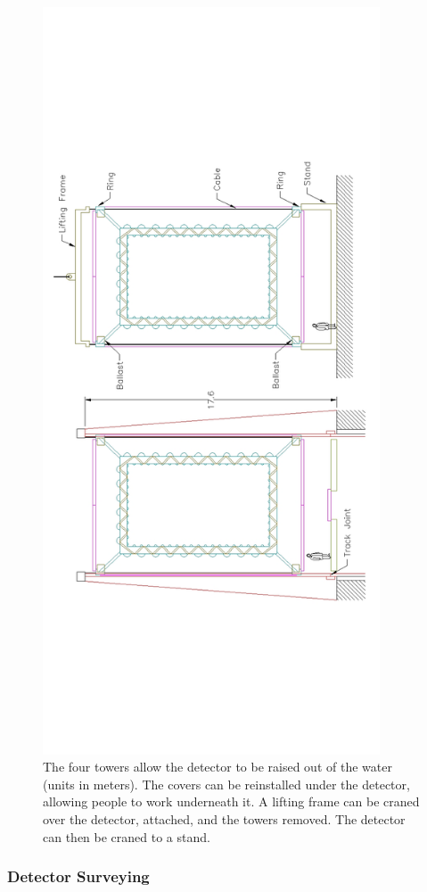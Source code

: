 \begin{figure}[htpb]
\centering\includegraphics[bb=0 300 800 900,clip=true,width=10cm,angle=270]{figures/fig3-5.jpg}
\caption{The four towers allow the detector to be raised out of the water (units in meters). The covers  can be reinstalled under the detector, allowing people to work underneath it. A lifting frame can be craned over the detector, attached, and the towers removed. The detector can then be craned to a stand.}
\label{fig:detremoved}
\end{figure}


\subsubsection{Detector Surveying}

